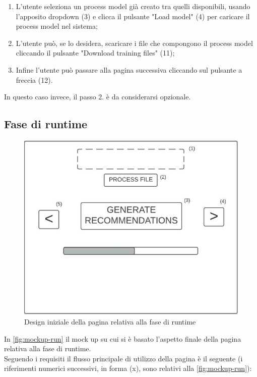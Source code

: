 \begin{enumerate}
\item L'utente seleziona un process model già creato tra quelli disponibili, usando l'apposito dropdown (3) e clicca il pulsante "Load model" (4) per caricare il process model nel sistema;

\item L'utente può, se lo desidera, scaricare i file che compongono il process model cliccando il pulsante "Download training files" (11); 

\item Infine l'utente può passare alla pagina successiva cliccando sul pulsante a freccia (12).

\end{enumerate}

In questo caso invece, il passo 2. è da considerarsi opzionale.


\subsection{Fase di runtime}

\begin{figure}[!h] 
    \centering 
    \includegraphics[width=0.8\columnwidth]{immagini/mockup-run.jpg} 
    \caption{Design iniziale della pagina relativa alla fase di runtime}
    \label{fig:mockup-run}
\end{figure}

In \autoref{fig:mockup-run} il mock up su cui si è basato l'aspetto finale della pagina relativa alla fase di runtime.
\\
Seguendo i requisiti il flusso principale di utilizzo della pagina è il seguente (i riferimenti numerici successivi, in forma (x), sono relativi alla \autoref{fig:mockup-run}):

